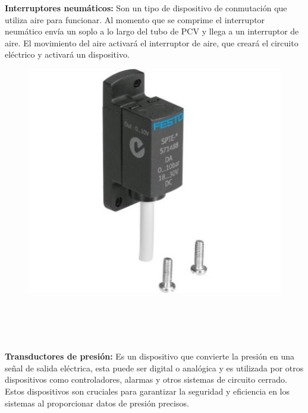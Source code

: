 \textbf{Interruptores neumáticos: }
Son un tipo de dispositivo de conmutación que utiliza aire para funcionar. Al momento que se comprime el interruptor neumático envía un soplo a lo largo del tubo de PCV y llega a un interruptor de aire. El movimiento del aire activará el interruptor de aire, que creará el circuito eléctrico y activará un dispositivo.
\begin{figure}[h]
	\centering
	\includegraphics[width=0.4\linewidth, height=0.2\textwidth]{img/neumatico}
	\caption{}
	\label{fig:neumatico}
\end{figure} 

\textbf{}\\\\\\\\
\textbf{Transductores de presión: }
Es un dispositivo que convierte la presión en una señal de salida eléctrica, esta puede ser digital o analógica y es utilizada por otros dispositivos como controladores, alarmas y otros sistemas de circuito cerrado. Estos dispositivos son cruciales para garantizar la seguridad y eficiencia en los sistemas al proporcionar datos de presión precisos. 


